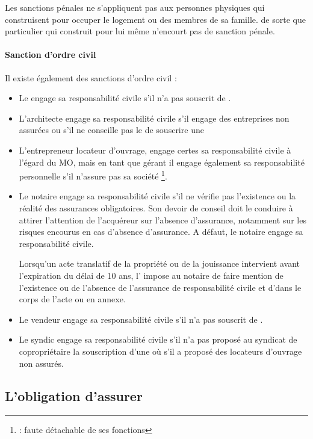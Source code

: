 			Les sanctions pénales ne s’appliquent pas aux personnes physiques qui construisent pour occuper le logement ou des membres de sa famille. de sorte que particulier qui construit pour lui même n'encourt pas de sanction pénale.

		\paragraph{Sanction d'ordre civil} Il existe également des sanctions d'ordre civil :
		\begin{itemize}
			\item Le \Mo engage sa responsabilité civile s’il n’a pas souscrit de \DO.

			\item L’architecte engage sa responsabilité civile s’il engage des entreprises non assurées ou s’il ne conseille pas le \MO de souscrire une \DO

			\item L’entrepreneur locateur d’ouvrage, engage certes sa responsabilité civile à l’égard du MO, mais en tant que gérant il engage également sa responsabilité personnelle s'il n'assure pas sa société \footnote{ : faute détachable de ses fonctions}.

			\item Le notaire engage sa responsabilité civile s'il ne vérifie pas l'existence ou la réalité des assurances obligatoires. Son devoir de conseil doit le conduire à attirer l’attention de l’acquéreur sur l’absence d’assurance, notamment sur les risques encourus en cas d’absence d’assurance. A défaut, le notaire engage sa responsabilité civile.

			Lorsqu’un acte translatif de la propriété ou de la jouissance intervient avant l’expiration du délai de 10 ans, l' impose au notaire de faire mention de l’existence ou de l’absence de l’assurance de responsabilité civile et d'\ado dans le corps de l’acte ou en annexe.

			\item Le vendeur engage sa responsabilité civile s’il n’a pas souscrit de \DO.

			\item Le syndic engage sa responsabilité civile s’il n’a pas proposé au syndicat de copropriétaire la souscription d’une \ado où s’il a proposé des locateurs d’ouvrage non assurés.
		\end{itemize}


	\subsection{L'obligation d'assurer}

